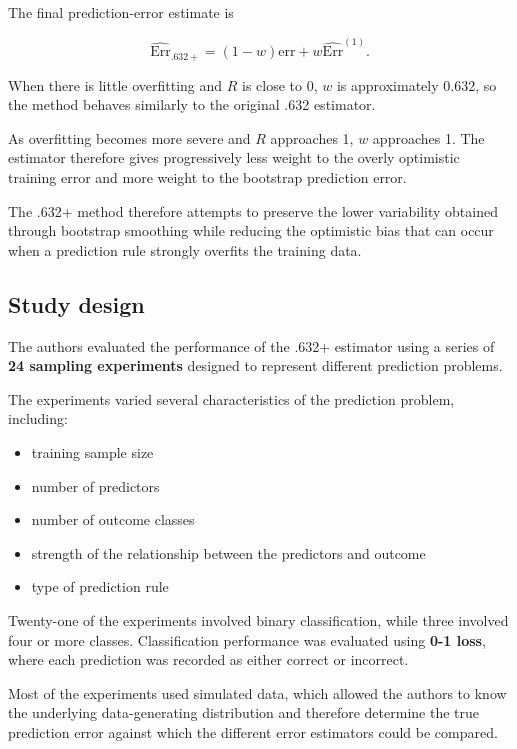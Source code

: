 \documentclass[
  letterpaper,
  DIV=11,
  numbers=noendperiod]{scrreprt}
\providecommand{\tightlist}{%
  \setlength{\itemsep}{0pt}\setlength{\parskip}{0pt}}
\begin{document}
The final prediction-error estimate is

\[
\widehat{\mathrm{Err}}_{.632+}
=
(1-w)\mathrm{err}
+
w\widehat{\mathrm{Err}}^{(1)}.
\]

When there is little overfitting and \(R\) is close to 0, \(w\) is
approximately 0.632, so the method behaves similarly to the original
.632 estimator.

As overfitting becomes more severe and \(R\) approaches 1, \(w\)
approaches 1. The estimator therefore gives progressively less weight to
the overly optimistic training error and more weight to the bootstrap
prediction error.

The .632+ method therefore attempts to preserve the lower variability
obtained through bootstrap smoothing while reducing the optimistic bias
that can occur when a prediction rule strongly overfits the training
data.

\subsection{Study design}\label{study-design-1}

The authors evaluated the performance of the .632+ estimator using a
series of \textbf{24 sampling experiments} designed to represent
different prediction problems.

The experiments varied several characteristics of the prediction
problem, including:

\begin{itemize}
\tightlist
\item
  training sample size
\item
  number of predictors
\item
  number of outcome classes
\item
  strength of the relationship between the predictors and outcome
\item
  type of prediction rule
\end{itemize}

Twenty-one of the experiments involved binary classification, while
three involved four or more classes. Classification performance was
evaluated using \textbf{0-1 loss}, where each prediction was recorded as
either correct or incorrect.

Most of the experiments used simulated data, which allowed the authors
to know the underlying data-generating distribution and therefore
determine the true prediction error against which the different error
estimators could be compared.
\end{document}
